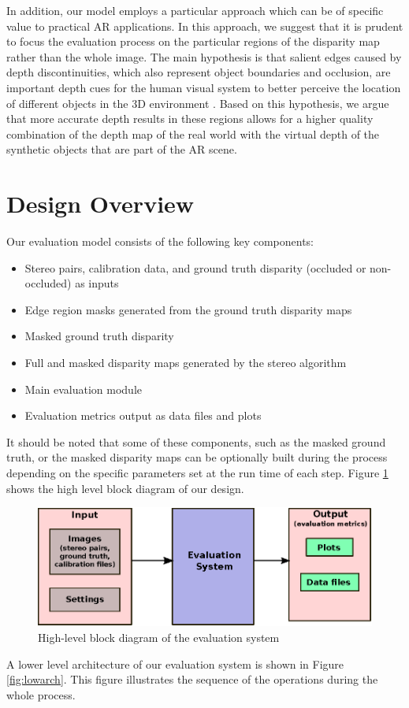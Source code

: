 In addition, our model employs a particular approach which can be of specific value to practical AR applications. In this approach, we suggest that
it is prudent to focus the evaluation process on the particular regions of the disparity map rather than the whole image. The main hypothesis
is that salient edges caused by depth discontinuities, which also represent object boundaries and occlusion, are important depth cues for the human
visual system to better perceive the location of different objects in the 3D environment \cite{sze11}.
Based on this hypothesis, we argue that more accurate depth results in these regions allows for a higher quality combination of the depth map of the real world with the 
virtual depth of the synthetic objects that are part of the AR scene.

\section{Design Overview}

Our evaluation model consists of the following key components:

\begin{itemize}
\item Stereo pairs, calibration data, and ground truth disparity (occluded or non-occluded) as inputs
\item Edge region masks generated from the ground truth disparity maps
\item Masked ground truth disparity
\item Full and masked disparity maps generated by the stereo algorithm 
\item Main evaluation module
\item Evaluation metrics output as data files and plots
\end{itemize}

It should be noted that some of these components, such as the masked ground truth, or the masked disparity maps 
can be optionally built during the process depending on the specific parameters set at the run time of each step. Figure \ref{fig:higharch} shows the high level block diagram of our design.

\begin{figure}[H]
\centering
\includegraphics{EvalSyshigh}
\caption{High-level block diagram of the evaluation system}
\label{fig:higharch}
\end{figure} 
\noindent
A lower level architecture of our evaluation system is shown in Figure \ref{fig:lowarch}. This figure illustrates the 
sequence of the operations during the whole process. 

